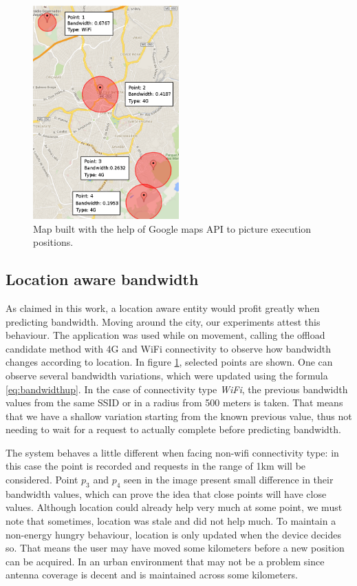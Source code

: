 \documentclass[10pt, conference, letterpaper]{IEEEtran}
\begin{document}
\begin{figure}[!t]
  \centering
  \includegraphics[width=0.5\textwidth]{plots/map/map-plot.png}
  \caption{Map built with the help of Google maps API to picture execution positions.}
  \label{fig:mapplot}
\end{figure}

  \subsection{Location aware bandwidth}
  As claimed in this work, a location aware entity would profit greatly when predicting bandwidth. Moving around the city, our experiments attest this behaviour. The application was used while on movement, calling the offload candidate method with 4G and WiFi connectivity to observe how bandwidth changes according to location. In figure \ref{fig:mapplot}, selected points are shown. One can observe several bandwidth variations, which were updated using the formula \ref{eq:bandwidthup}. In the case of connectivity type \textit{WiFi}, the previous bandwidth values from the same SSID or in a radius from 500 meters is taken. That means that we have a shallow variation starting from the known previous value, thus not needing to wait for a request to actually complete before predicting bandwidth.
  
  The system behaves a little different when facing non-wifi connectivity type: in this case the point is recorded and requests in the range of 1km will be considered. Point $p_3$ and $p_4$ seen in the image present small difference in their bandwidth values, which can prove the idea that close points will have close values. Although location could already help very much at some point, we must note that sometimes, location was stale and did not help much. To maintain a non-energy hungry behaviour, location is only updated when the device decides so. That means the user may have moved some kilometers before a new position can be acquired. In an urban environment that may not be a problem since antenna coverage is decent and is maintained across some kilometers.
\end{document}
